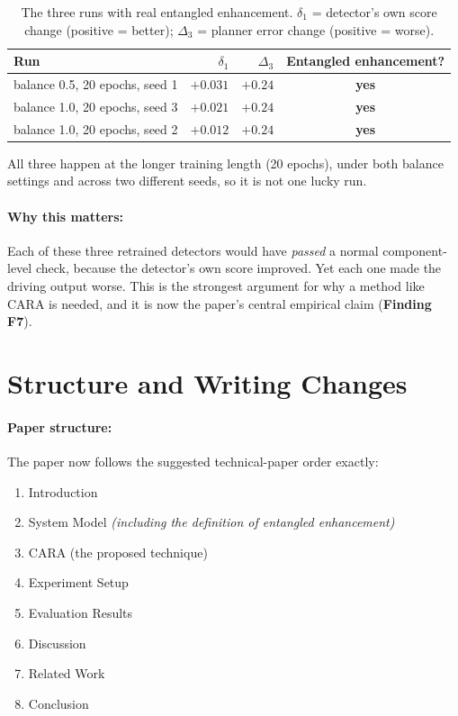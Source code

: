 \documentclass[11pt,a4paper]{article}
\begin{document}
\begin{table}[h!]
\centering
\caption{The three runs with real entangled enhancement.
$\delta_1$ = detector's own score change (positive = better);
$\Delta_3$ = planner error change (positive = worse).}
\renewcommand{\arraystretch}{1.25}
\begin{tabular}{@{}lrrc@{}}
\toprule
\textbf{Run} & \textbf{$\delta_1$} & \textbf{$\Delta_3$} & \textbf{Entangled enhancement?} \\
\midrule
balance 0.5, 20 epochs, seed 1 & $+0.031$ & $+0.24$ & \textbf{yes} \\
balance 1.0, 20 epochs, seed 3 & $+0.021$ & $+0.24$ & \textbf{yes} \\
balance 1.0, 20 epochs, seed 2 & $+0.012$ & $+0.24$ & \textbf{yes} \\
\bottomrule
\end{tabular}
\end{table}

\noindent
All three happen at the longer training length (20 epochs), under both balance
settings and across two different seeds, so it is not one lucky run.

\paragraph{Why this matters:} Each of these three retrained detectors would have
\emph{passed} a normal component-level check, because the detector's own score
improved. Yet each one made the driving output worse. This is the strongest
argument for why a method like CARA is needed, and it is now the paper's central
empirical claim (\textbf{Finding F7}).

\section{Structure and Writing Changes}

\paragraph{Paper structure:} The paper now follows the suggested technical-paper
order exactly:

\begin{enumerate}[noitemsep]
    \item Introduction
    \item System Model \emph{(including the definition of entangled enhancement)}
    \item CARA (the proposed technique)
    \item Experiment Setup
    \item Evaluation Results
    \item Discussion
    \item Related Work
    \item Conclusion
\end{enumerate}
\end{document}
